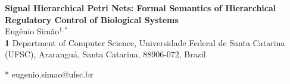 \documentclass[10pt,letterpaper]{article}
\begin{document}
\doublespacing
\linenumbers
\vspace*{0.2in}

\begin{flushleft}
{\Large
\textbf{Signal Hierarchical Petri Nets: Formal Semantics of Hierarchical Regulatory Control of Biological Systems}
}
\newline
\\
Eug\^enio Sim\~ao$^{1,*}$
\\
\bigskip
\textbf{1} Department of Computer Science, Universidade Federal de Santa Catarina (UFSC), Ararangu\'a, Santa Catarina, 88906-072, Brazil
\\
\bigskip

* eugenio.simao@ufsc.br

\end{flushleft}

\end{document}
